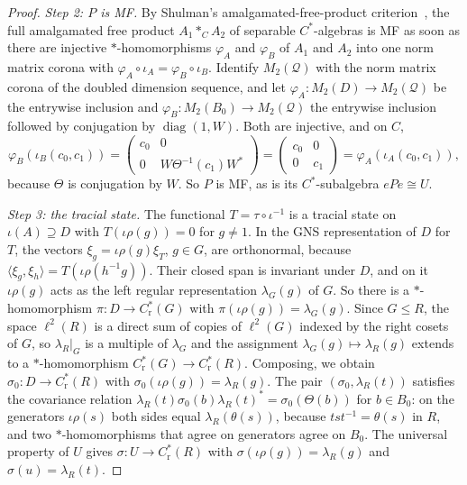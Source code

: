\documentclass[11pt]{amsart}
\newcommand{\leanverified}[2]{\ignorespaces}
\theoremstyle{remark}
\theoremstyle{plain}
\begin{document}
\begin{proof}
\emph{Step 2: $P$ is MF.}  By Shulman's amalgamated-free-product
criterion~\cite[Theorem~16]{Shulman},
the full amalgamated free product $A_1*_CA_2$ of separable $C^*$-algebras
is MF as soon as there are injective $*$-homomorphisms $\varphi_A$ and
$\varphi_B$ of $A_1$ and $A_2$ into one norm matrix corona with
$\varphi_A\circ\iota_A=\varphi_B\circ\iota_B$.
Identify $M_2(\mathcal Q)$ with the norm matrix corona of the doubled dimension
sequence, and let $\varphi_A\colon M_2(D)\to M_2(\mathcal Q)$ be the
entrywise inclusion and
$\varphi_B\colon M_2(B_0)\to M_2(\mathcal Q)$ the entrywise inclusion
followed by conjugation by $\operatorname{diag}(1,W)$.  Both are injective,
and on $C$,
\[
 \varphi_B(\iota_B(c_0,c_1))
 =\begin{pmatrix}c_0&0\\0&W\Theta^{-1}(c_1)W^*\end{pmatrix}
 =\begin{pmatrix}c_0&0\\0&c_1\end{pmatrix}
 =\varphi_A(\iota_A(c_0,c_1)),
\]
because $\Theta$ is conjugation by $W$.  So $P$ is MF, as is its
$C^*$-subalgebra $ePe\cong U$.

\emph{Step 3: the tracial state.}  The functional
$T=\tau\circ\iota^{-1}$ is a tracial state on $\iota(A)\supseteq D$ with
$T(\iota\rho(g))=0$ for $g\ne1$.  In the GNS representation of $D$ for
$T$, the vectors $\xi_g=\iota\rho(g)\xi_T$, $g\in G$, are orthonormal,
because $\langle\xi_g,\xi_h\rangle=T(\iota\rho(h^{-1}g))$.  Their closed
\leanverified{Manuscript/OneSidedMFRadical/HNNCoronaConjugatorSentenceAudit}{GroupApproximation.Manuscript.OneSidedMFRadical.HNNCoronaConjugatorSentenceAudit.regularCharacterGNS_orbit_orthonormal}
span is invariant under $D$, and on it $\iota\rho(g)$ acts as the left
regular representation $\lambda_G(g)$ of $G$.  So there is a
\leanverified{Manuscript/OneSidedMFRadical/HNNCoronaConjugatorSentenceAudit}{GroupApproximation.Manuscript.OneSidedMFRadical.HNNCoronaConjugatorSentenceAudit.regularCharacterGNS_left_translation}
$*$-homomorphism $\pi\colon D\to C^*_{\mathrm r}(G)$ with
$\pi(\iota\rho(g))=\lambda_G(g)$.  Since $G\le R$, the space
$\ell^2(R)$ is a direct sum of copies of $\ell^2(G)$ indexed by the right
cosets of $G$, so $\lambda_R|_G$ is a multiple of $\lambda_G$ and the
assignment $\lambda_G(g)\mapsto\lambda_R(g)$ extends to a
$*$-homomorphism $C^*_{\mathrm r}(G)\to C^*_{\mathrm r}(R)$.  Composing, we
obtain $\sigma_0\colon D\to C^*_{\mathrm r}(R)$ with
$\sigma_0(\iota\rho(g))=\lambda_R(g)$.  The pair $(\sigma_0,\lambda_R(t))$
satisfies the covariance relation
$\lambda_R(t)\sigma_0(b)\lambda_R(t)^*=\sigma_0(\Theta(b))$ for
$b\in B_0$: on the generators $\iota\rho(s)$ both sides equal
$\lambda_R(\theta(s))$, because $tst^{-1}=\theta(s)$ in $R$, and two
$*$-homomorphisms that agree on generators agree on $B_0$.  The universal
property of $U$ gives $\sigma\colon U\to C^*_{\mathrm r}(R)$ with
$\sigma(\iota\rho(g))=\lambda_R(g)$ and $\sigma(u)=\lambda_R(t)$.


\end{proof}
\end{document}
